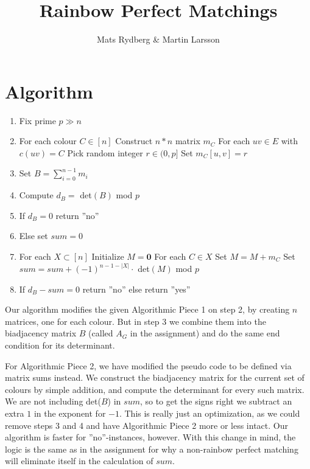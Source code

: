 \documentclass{tufte-handout}
\title{\sf Rainbow Perfect Matchings}
\author{Mats Rydberg \& Martin Larsson}
\begin{document}
\maketitle

\section{Algorithm}
\begin{enumerate}
\item Fix prime $p \gg n$ 
\item For each colour $C \in [n]$
\subitem Construct $n \ast n$ matrix $m_C$
\subitem For each $uv \in E$ with $ c(uv) = C$
\subsubitem Pick random integer $r \in (0,p]$
\subsubitem Set $m_C[u,v] = r$
\item Set $B = \sum_{i = 0}^{n-1}m_i$
\item Compute $d_B =$ det$(B)$ mod $p$
\item If $d_B = 0$ return ''no''
\item Else set $sum = 0$
\item For each $X \subset [n]$
\subitem Initialize $M = \mathbf{0}$ 
\subitem For each $C \in X$
\subsubitem Set $M = M + m_C$
\subitem Set $sum = sum + (-1)^{n-1-|X|} \cdot$ det$(M)$ mod $p$
\item If $d_B - sum = 0$ return ''no'' else return ''yes''
\end{enumerate}

\noindent Our algorithm modifies the given Algorithmic Piece 1 on step 2, by creating $n$ matrices, one for each colour. But in step 3 we combine them into the biadjacency matrix $B$ (called $A_G$ in the assignment) and do the same end condition for its determinant.

For Algorithmic Piece 2, we have modified the pseudo code to be defined via matrix sums instead. We construct the biadjacency matrix for the current set of colours by simple addition, and compute the determinant for every such matrix. We are not including det($B$) in $sum$, so to get the signs right we subtract an extra $1$ in the exponent for $-1$. This is really just an optimization, as we could remove steps 3 and 4 and have Algorithmic Piece 2 more or less intact. Our algorithm is faster for ''no''-instances, however. With this change in mind, the logic is the same as in the assignment for why a non-rainbow perfect matching will eliminate itself in the calculation of $sum$.
\end{document}
